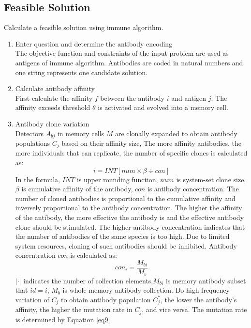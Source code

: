 \documentclass[11pt,a4paper,oldfontcommands]{memoir}
\begin{document}
\subsection{Feasible Solution}
Calculate a feasible solution using immune algorithm.
\begin{enumerate}
\item {Enter question and determine the antibody encoding}\\
The objective function and constraints of the input problem are used as antigens of immune algorithm. Antibodies are coded in natural numbers and one string represents one candidate solution.
\item {Calculate antibody affinity }\\
First calculate the affinity $f$ between the antibody $i$ and antigen $j$. The affinity exceeds threshold $\theta$ is activated and evolved into a memory cell.
\item{Antibody clone variation} \\
Detectors $A_{bj}$ in memory cells $M$ are clonally expanded to obtain antibody populations $C_{j}$ based on their affinity size, The more affinity antibodies, the more individuals that can replicate, the number of specific clones is calculated as:
\begin{equation}
i=INT[num \times \beta \div con]
\tag{8}
\end{equation}
In the formula, $INT$ is upper rounding function, $num$ is system-set clone size, $\beta$ is cumulative affinity of the antibody, $con$ is antibody concentration. The number of cloned antibodies is proportional to the cumulative affinity and inversely proportional to the antibody concentration. The higher the affinity of the antibody, the more effective the antibody is and the effective antibody clone should be stimulated. The higher antibody concentration indicates that the number of antibodies of the same species is too high. Due to limited system resources, cloning of such antibodies should be inhibited. Antibody concentration $con$ is calculated as:
\begin{equation}
con_i=\frac{M_{bi}}{M_{b}}
\tag{9} \label {eq9}
\end{equation}
 $|\cdot|$ indicates the number of collection elements,$M_{bi}$ is memory antibody subset that $id=i$, $M_{b}$ is whole memory antibody collection.
Do high frequency variation of $C_{j}$ to obtain antibody population $C_{j}^*$, the lower the antibody's affinity, the higher the mutation rate in $C_{j}$, and vice versa. The mutation rate is determined by Equation \ref {eq9}.


\end{enumerate}
\end{document}
